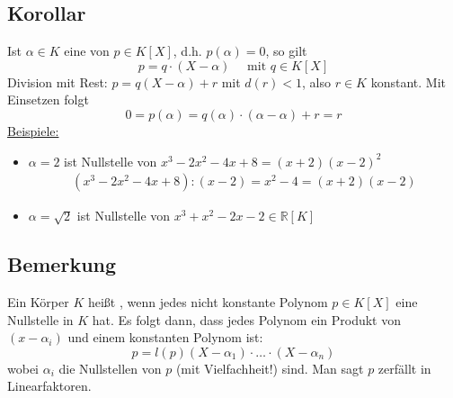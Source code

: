 \subsection[Korollar über Zerlegung mit Hilfe der Nullstelle]{Korollar} %
\label{sub:49}
Ist $\alpha \in K$ eine  von $p \in K[X]$, d.h. $p(\alpha)=0$, so gilt 
\[
	p= q \cdot (X-\alpha) \quad \text{ mit } q \in K[X]
\]
Division mit Rest: $p=q(X-\alpha)+r$ mit $d(r)<1$, also $r \in K$ konstant. Mit Einsetzen folgt 
\[
	0=p(\alpha) = q(\alpha) \cdot (\alpha - \alpha) + r= r
\]
\uline{Beispiele:} \begin{itemize}
	\item $\alpha =2$ ist Nullstelle von $x^3 -2x^2 -4x +8 = (x+2)(x-2)^2$
	\begin{align*}
		(x^3 -2x^2 -4x +8) : (x-2) = x^2 -4 = (x+2)(x-2)
	\end{align*}
	\item $\alpha = \sqrt{2}$ ist Nullstelle von $x^3 +x^2 -2x -2 \in \mathds{R}[K]$ 
\end{itemize}

\subsection[Bemerkung algebraisch abgeschlossen und Linearfaktoren]{Bemerkung} %
\label{sub:410}
Ein Körper $K$ heißt , wenn jedes nicht konstante Polynom $p \in K[X]$ eine Nullstelle in $K$ hat. Es folgt dann, dass jedes Polynom
ein Produkt von  $(x-\alpha_i)$ und einem konstanten Polynom ist:
\[
	p = l(p) (X-\alpha_1) \cdot \ldots \cdot (X-\alpha_n)
\]
wobei $\alpha_i$ die Nullstellen von $p$ (mit Vielfachheit!) sind. Man sagt $p$ zerfällt in Linearfaktoren. 

